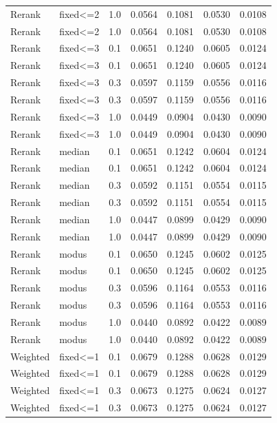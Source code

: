 \begin{tabular}{llrrrrr}
  Rerank &  fixed<=2 &    1.0 &   0.0564 &  0.1081 & 0.0530 & 0.0108 \\
  Rerank &  fixed<=2 &    1.0 &   0.0564 &  0.1081 & 0.0530 & 0.0108 \\
  Rerank &  fixed<=3 &    0.1 &   0.0651 &  0.1240 & 0.0605 & 0.0124 \\
  Rerank &  fixed<=3 &    0.1 &   0.0651 &  0.1240 & 0.0605 & 0.0124 \\
  Rerank &  fixed<=3 &    0.3 &   0.0597 &  0.1159 & 0.0556 & 0.0116 \\
  Rerank &  fixed<=3 &    0.3 &   0.0597 &  0.1159 & 0.0556 & 0.0116 \\
  Rerank &  fixed<=3 &    1.0 &   0.0449 &  0.0904 & 0.0430 & 0.0090 \\
  Rerank &  fixed<=3 &    1.0 &   0.0449 &  0.0904 & 0.0430 & 0.0090 \\
  Rerank &    median &    0.1 &   0.0651 &  0.1242 & 0.0604 & 0.0124 \\
  Rerank &    median &    0.1 &   0.0651 &  0.1242 & 0.0604 & 0.0124 \\
  Rerank &    median &    0.3 &   0.0592 &  0.1151 & 0.0554 & 0.0115 \\
  Rerank &    median &    0.3 &   0.0592 &  0.1151 & 0.0554 & 0.0115 \\
  Rerank &    median &    1.0 &   0.0447 &  0.0899 & 0.0429 & 0.0090 \\
  Rerank &    median &    1.0 &   0.0447 &  0.0899 & 0.0429 & 0.0090 \\
  Rerank &     modus &    0.1 &   0.0650 &  0.1245 & 0.0602 & 0.0125 \\
  Rerank &     modus &    0.1 &   0.0650 &  0.1245 & 0.0602 & 0.0125 \\
  Rerank &     modus &    0.3 &   0.0596 &  0.1164 & 0.0553 & 0.0116 \\
  Rerank &     modus &    0.3 &   0.0596 &  0.1164 & 0.0553 & 0.0116 \\
  Rerank &     modus &    1.0 &   0.0440 &  0.0892 & 0.0422 & 0.0089 \\
  Rerank &     modus &    1.0 &   0.0440 &  0.0892 & 0.0422 & 0.0089 \\
Weighted &  fixed<=1 &    0.1 &   0.0679 &  0.1288 & 0.0628 & 0.0129 \\
Weighted &  fixed<=1 &    0.1 &   0.0679 &  0.1288 & 0.0628 & 0.0129 \\
Weighted &  fixed<=1 &    0.3 &   0.0673 &  0.1275 & 0.0624 & 0.0127 \\
Weighted &  fixed<=1 &    0.3 &   0.0673 &  0.1275 & 0.0624 & 0.0127 \\

\end{tabular}
